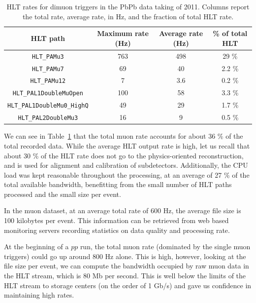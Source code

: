 \begin{table}[h]
  \begin{center}
    \begin{tabular}{|c|c|c|c|}
      \hline
      HLT path & Maximum rate (Hz) & Average rate (Hz)& \% of total
      HLT\\
      \hline
      \hline
      \verb?HLT_PAMu3?   &763 &498 &29 \%\\
      \verb?HLT_PAMu7?   &69 & 40&2.2 \% \\
      \verb?HLT_PAMu12?   &7 &3.6 & 0.2 \% \\
      \verb?HLT_PAL1DoubleMuOpen?  &100 &58 & 3.3 \% \\
      \verb?HLT_PAL1DoubleMu0_HighQ? &49 &29 & 1.7 \% \\
      \verb?HLT_PAL2DoubleMu3?  &16 &9 & 0.5 \% \\
      \hline
    \end{tabular}
    \end{center}
  \caption{HLT rates for dimuon triggers in the PbPb data taking of
    2011. Columns report the total rate, average rate, in Hz,
    and the fraction of total HLT rate.}
\label{tab:rates2013}
\end{table}

We can see in Table~\ref{tab:rates2013} that the total muon rate
accounts for about 36 \% of the total recorded data. While the average
HLT output rate is high, let us recall that about 30 \% of the HLT rate
does not go to the physics-oriented reconstruction, and is used for
alignment and calibration of subdetectors.
Additionally, the CPU load was kept reasonable throughout the
processing, at an average of 27 \% of the total available bandwidth,
benefitting from the small number of HLT paths processed and the small
size per event.

In the muon dataset, at an average total rate of 600 Hz, the average
file size is 100 kilobytes per event. This information can be
retrieved from web based monitoring servers recording statistics on
data quality and processing rate.

At the beginning of a $pp$ run, the total muon rate (dominated by the
single muon triggers) could go up around 800 Hz alone. This is
high, however, looking at the file size per event, we can compute the
bandwidth occupied by raw muon data in the HLT stream, which is 80 Mb
per second. This is well below the limits of the HLT stream to storage centers
(on the order of 1 Gb/s) and gave us confidence in maintaining high
rates.



